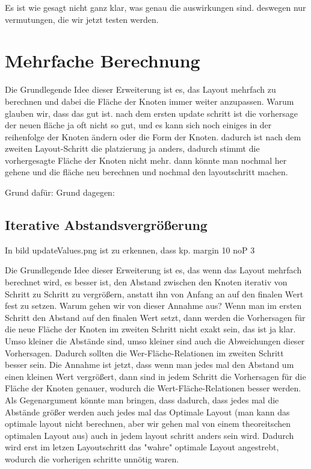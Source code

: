 Es ist wie gesagt nicht ganz klar, was genau die auswirkungen sind. deswegen nur vermutungen, die wir jetzt testen werden.




\section{Mehrfache Berechnung} \label{sec:MehrfacheBerechnung}
Die Grundlegende Idee dieser Erweiterung ist es, das Layout mehrfach zu berechnen und dabei die Fläche der Knoten immer weiter anzupassen. 
Warum glauben wir, dass das gut ist. nach dem ersten update schritt ist die vorhersage der neuen fläche ja oft nicht so gut, und es kann sich noch einiges in der reihenfolge der Knoten ändern oder die Form der Knoten. dadurch ist nach dem zweiten Layout-Schritt die platzierung ja anders, dadurch stimmt die vorhergesagte Fläche der Knoten nicht mehr. dann könnte man nochmal her gehene und die fläche neu berechnen und nochmal den layoutschritt machen. 

Grund dafür:
Grund dagegen: 

\subsection{Iterative Abstandsvergrößerung} \label{sec:IterativeAbstandsvergrößerung}
In bild updateValues.png ist zu erkennen, dass kp. margin 10 noP 3

Die Grundlegende Idee dieser Erweiterung ist es, das wenn das Layout mehrfach berechnet wird, es besser ist, den Abstand zwischen den Knoten iterativ von Schritt zu Schritt zu vergrößern, anstatt ihn von Anfang an auf den finalen Wert fest zu setzen. 
Warum gehen wir von dieser Annahme aus? 
Wenn man im ersten Schritt den Abstand auf den finalen Wert setzt, dann werden die Vorhersagen für die neue Fläche der Knoten im zweiten Schritt nicht exakt sein, das ist ja klar. Umso kleiner die Abstände sind, umso kleiner sind auch die Abweichungen dieser Vorhersagen. Dadurch sollten die Wer-Fläche-Relationen im zweiten Schritt besser sein. 
Die Annahme ist jetzt, dass wenn man jedes mal den Abstand um einen kleinen Wert vergrößert, dann sind in jedem Schritt die Vorhersagen für die Fläche der Knoten genauer, wodurch die Wert-Fläche-Relationen besser werden. Als Gegenargument könnte man bringen, dass dadurch, dass jedes mal die Abstände größer werden auch jedes mal das Optimale Layout (man kann das optimale layout nicht berechnen, aber wir gehen mal von einem theoreitschen optimalen Layout aus) auch in jedem layout schritt anders sein wird. Dadurch wird erst im letzen Layoutschritt das "wahre" optimale Layout angestrebt, wodurch die vorherigen schritte unnötig waren.

